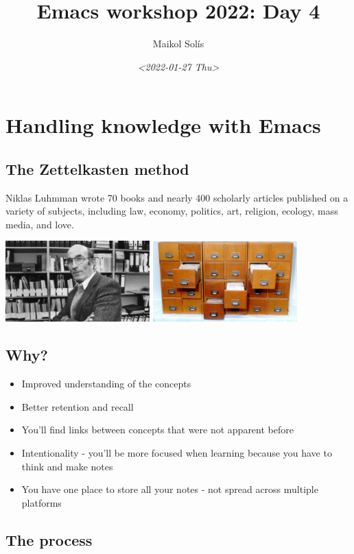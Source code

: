\documentclass[11pt]{article}
\author{Maikol Solís}
\date{\textit{<2022-01-27 Thu>}}
\title{Emacs workshop 2022: Day 4}
\begin{document}
\section{Handling knowledge with Emacs}
\label{sec:org5a9ea94}

\subsection{The Zettelkasten method}
\label{sec:org4e96c27}

Niklas Luhmman wrote 70 books and nearly 400 scholarly articles published on a variety of subjects, including law, economy, politics, art, religion, ecology, mass media, and love.

\begin{center}
\includegraphics[width=15em]{./nl.png}
\includegraphics[width=15em]{./zk.png}
\end{center}

\subsection{Why?}
\label{sec:orgc70237b}

\begin{itemize}
\item Improved understanding of the concepts
\item Better retention and recall
\item You'll find links between concepts that were not apparent before
\item Intentionality - you'll be more focused when learning because you have to think and make notes
\item You have one place to store all your notes - not spread across multiple platforms
\end{itemize}


\subsection{The process}
\label{sec:org2aaf6c8}
\end{document}
